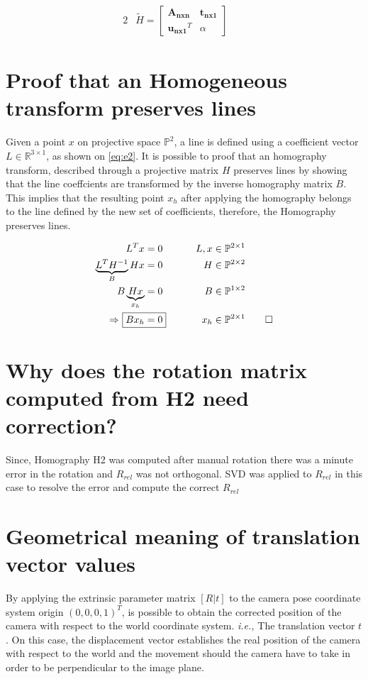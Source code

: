 \documentclass{article}
\begin{document}
\begin{alignat}{2}
&\tilde{H} = \begin{bmatrix}
\mathbf{A_{nxn}} & \mathbf{t_{nx1}} \\
\mathbf{u_{nx1}}^{T} & \alpha
\end{bmatrix} & \quad   \label{eq:e1}
\end{alignat}


\section{Proof that an Homogeneous transform preserves lines}
Given a point $x$ on projective space $\mathbb{P}^2$, a line is defined using a coefficient vector $L \in \mathbb{R}^{3 \times 1}$, as shown on \eqref{eq:e2}. It is possible to proof that an homography transform, described through a projective matrix $H$ preserves lines by showing that the line coeffcients are transformed by the inverse homography matrix $B$. This implies that the resulting point $x_{h}$ after applying the homography belongs to the line defined by the new set of coefficients, therefore, the Homography preserves lines.

\begin{alignat}{3}
L^{T}x &= 0 \qquad &L, x &\in \mathbb{P}^{2 \times 1} \label{eq:e2} \\
\nonumber
\underbrace{L^{T}H^{-1}}_{B}Hx &= 0 \qquad &H &\in \mathbb{P}^{2 \times 2} \\
\nonumber
B\underbrace{Hx}_{x_h} &= 0 \qquad &B &\in \mathbb{P}^{1 \times 2} \\
\Rightarrow~ \Aboxed{Bx_h &= 0} \qquad &x_h &\in \mathbb{P}^{2 \times 1} \qed \label{eq:e3}
\end{alignat}

\section{Why does the rotation matrix computed from H2 need correction?}
Since, Homography H2 was computed after manual rotation there was a minute error in the rotation and $R_{rel}$ was not orthogonal. SVD was applied to $R_{rel}$ in this case to resolve the error and compute the correct $R_{rel}$

\section{Geometrical meaning of translation vector values}
By applying the extrinsic parameter matrix $[R | t]$ to the camera pose coordinate system origin $(0, 0, 0, 1)^T$, is possible to obtain the corrected position of the camera with respect to the world coordinate system. \textit{i.e.,} The translation vector $t$. On this case, the displacement vector establishes the real position of the camera with respect to the world and the movement should the camera have to take in order to be perpendicular to the image plane.
\end{document}
